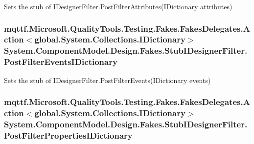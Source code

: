 Sets the stub of I\-Designer\-Filter.\-Post\-Filter\-Attributes(\-I\-Dictionary attributes)

\hypertarget{class_system_1_1_component_model_1_1_design_1_1_fakes_1_1_stub_i_designer_filter_a8fac60b37f51cf99cb73e986c335be27}{
\subsubsection[{Post\-Filter\-Events\-I\-Dictionary}]{\setlength{\rightskip}{0pt plus 5cm}mqttf.\-Microsoft.\-Quality\-Tools.\-Testing.\-Fakes.\-Fakes\-Delegates.\-Action$<$global.\-System.\-Collections.\-I\-Dictionary$>$ System.\-Component\-Model.\-Design.\-Fakes.\-Stub\-I\-Designer\-Filter.\-Post\-Filter\-Events\-I\-Dictionary}}\label{class_system_1_1_component_model_1_1_design_1_1_fakes_1_1_stub_i_designer_filter_a8fac60b37f51cf99cb73e986c335be27}


Sets the stub of I\-Designer\-Filter.\-Post\-Filter\-Events(\-I\-Dictionary events)

\hypertarget{class_system_1_1_component_model_1_1_design_1_1_fakes_1_1_stub_i_designer_filter_a25b44ce8e5324a6b67bdf3610d5a19d2}{
\subsubsection[{Post\-Filter\-Properties\-I\-Dictionary}]{\setlength{\rightskip}{0pt plus 5cm}mqttf.\-Microsoft.\-Quality\-Tools.\-Testing.\-Fakes.\-Fakes\-Delegates.\-Action$<$global.\-System.\-Collections.\-I\-Dictionary$>$ System.\-Component\-Model.\-Design.\-Fakes.\-Stub\-I\-Designer\-Filter.\-Post\-Filter\-Properties\-I\-Dictionary}}\label{class_system_1_1_component_model_1_1_design_1_1_fakes_1_1_stub_i_designer_filter_a25b44ce8e5324a6b67bdf3610d5a19d2}


